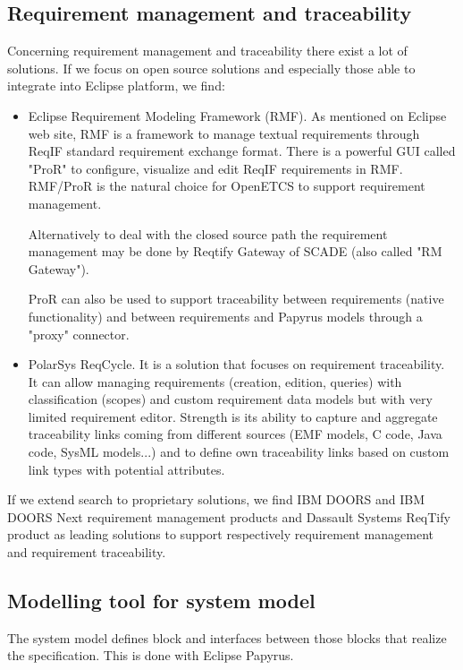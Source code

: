\documentclass[11pt]{template/openetcs_report}
\begin{document}
\subsection{Requirement management and traceability}
\label{sec-4-2} 
Concerning requirement management and traceability there exist a lot of solutions. If we focus on open source solutions and especially those able to integrate into Eclipse platform, we find:
\begin{itemize}
\item Eclipse Requirement Modeling Framework (RMF). As mentioned on Eclipse web site, RMF is a framework to manage textual requirements through ReqIF standard requirement exchange format. There is a powerful GUI called "ProR" to configure, visualize and edit ReqIF requirements in RMF.
RMF/ProR is the natural choice for OpenETCS to support requirement management.

Alternatively to deal with the closed source path the requirement management may
be done by Reqtify Gateway of SCADE (also called "RM Gateway"). 

ProR can also be used to support traceability between requirements (native functionality) and between requirements and Papyrus models through a "proxy" connector.

\item PolarSys ReqCycle. It is a solution that focuses on requirement traceability. It can allow managing requirements (creation, edition, queries) with classification (scopes) and custom requirement data models but with very limited requirement editor. Strength is its ability to capture and aggregate traceability links coming from different sources (EMF models, C code, Java code, SysML models...) and to define own traceability links based on custom link types with potential attributes.

\end{itemize}

If we extend search to proprietary solutions, we find IBM DOORS and IBM DOORS Next requirement management products and Dassault Systems ReqTify product as leading solutions to support respectively requirement management and requirement traceability.

\subsection{Modelling tool for system model}
The system model defines block and interfaces between those blocks that realize
the specification. This is done with Eclipse Papyrus. 
\end{document}
